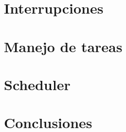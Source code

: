 \documentclass[10pt, a4paper]{article}
\begin{document}
	\section{Interrupciones}
		
	\clearpage

	\section{Manejo de tareas}
		
	\clearpage

	\section{Scheduler}
		
	\clearpage

	\section{Conclusiones}
		
\end{document}
